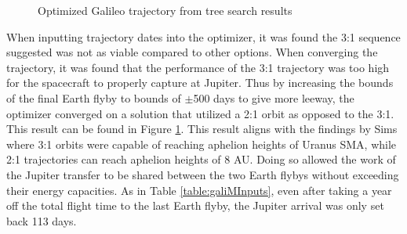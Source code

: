 \documentclass[letterpaper, paper,11pt]{AAS}	%
\newcommand*\circled[1]{\tikz[baseline=(char.base)]{
            \node[shape=circle,draw,inner sep=0.8pt] (char) {#1};}}
\begin{document}
\begin{figure}[htb]
    \centering
    \caption{Optimized Galileo trajectory from tree search results}
    \label{fig:galiMalto}
\end{figure}
\clearpage
When inputting trajectory dates into the optimizer, it was found the 3:1 sequence suggested was not as viable compared to other options. When converging the trajectory, it was found that the performance of the 3:1 trajectory was too high for the spacecraft to properly capture at Jupiter. Thus by increasing the bounds of the final Earth flyby to bounds of $\pm$500 days to give more leeway, the optimizer converged on a solution that utilized a 2:1 orbit as opposed to the 3:1. This result can be found in Figure \ref*{fig:galiMalto}. This result aligns with the findings by Sims \cite{sims1994} where 3:1 orbits were capable of reaching aphelion heights of Uranus SMA, while 2:1 trajectories can reach aphelion heights of 8 AU. Doing so allowed the work of the Jupiter transfer to be shared between the two Earth flybys without exceeding their energy capacities. As in Table \ref*{table:galiMInputs}, even after taking a year off the total flight time to the last Earth flyby, the Jupiter arrival was only set back 113 days.
\end{document}
